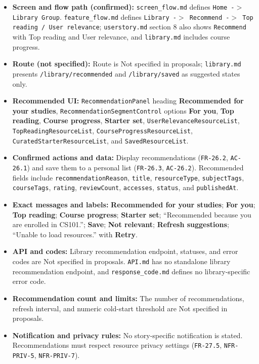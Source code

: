 \documentclass[12pt]{article}
\begin{document}
\begin{itemize}
\item \textbf{Screen and flow path (confirmed):} \texttt{screen\_flow.md} defines \texttt{Home -$>$ Library Group}. \texttt{feature\_flow.md} defines \texttt{Library -$>$ Recommend -$>$ Top reading / User relevance}; \texttt{userstory.md} section 8 also shows \texttt{Recommend} with Top reading and User relevance, and \texttt{library.md} includes course progress.
\item \textbf{Route (not specified):} Route is Not specified in proposals; \texttt{library.md} presents \texttt{/library/recommended} and \texttt{/library/saved} as suggested states only.
\item \textbf{Recommended UI:} \texttt{RecommendationPanel} heading \textbf{Recommended for your studies}, \texttt{RecommendationSegmentControl} options \textbf{For you}, \textbf{Top reading}, \textbf{Course progress}, \textbf{Starter set}, \texttt{UserRelevanceResourceList}, \texttt{TopReadingResourceList}, \texttt{CourseProgressResourceList}, \texttt{CuratedStarterResourceList}, and \texttt{SavedResourceList}.
\item \textbf{Confirmed actions and data:} Display recommendations (\texttt{FR-26.2}, \texttt{AC-26.1}) and save them to a personal list (\texttt{FR-26.3}, \texttt{AC-26.2}). Recommended fields include \texttt{recommendationReason}, \texttt{title}, \texttt{resourceType}, \texttt{subjectTags}, \texttt{courseTags}, \texttt{rating}, \texttt{reviewCount}, \texttt{accesses}, \texttt{status}, and \texttt{publishedAt}.
\item \textbf{Exact messages and labels:} \textbf{Recommended for your studies}; \textbf{For you}; \textbf{Top reading}; \textbf{Course progress}; \textbf{Starter set}; “Recommended because you are enrolled in CS101.”; \textbf{Save}; \textbf{Not relevant}; \textbf{Refresh suggestions}; “Unable to load resources.” with \textbf{Retry}.
\item \textbf{API and codes:} Library recommendation endpoint, statuses, and error codes are Not specified in proposals. \texttt{API.md} has no standalone library recommendation endpoint, and \texttt{response\_code.md} defines no library-specific error code.
\item \textbf{Recommendation count and limits:} The number of recommendations, refresh interval, and numeric cold-start threshold are Not specified in proposals.
\item \textbf{Notification and privacy rules:} No story-specific notification is stated. Recommendations must respect resource privacy settings (\texttt{FR-27.5}, \texttt{NFR-PRIV-5}, \texttt{NFR-PRIV-7}).
\end{itemize}
\par\medskip
\end{document}
